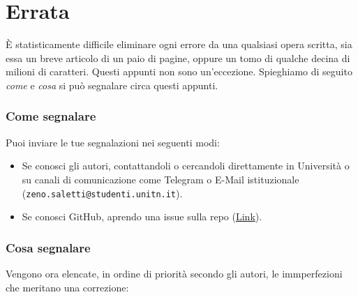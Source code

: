 \section*{Errata}
È statisticamente difficile eliminare ogni errore da una qualsiasi opera scritta, sia
essa un breve articolo di un paio di pagine, oppure un tomo di qualche decina di milioni
di caratteri. Questi appunti non sono un'eccezione.
Spieghiamo di seguito \textit{come} e \textit{cosa} si può segnalare circa questi appunti.

\subsubsection*{Come segnalare}
Puoi inviare le tue segnalazioni nei seguenti modi:
\begin{itemize}
    \item Se conosci gli autori, contattandoli o cercandoli direttamente in Università
    o su canali di comunicazione come Telegram o E-Mail istituzionale
    (\texttt{zeno.saletti@studenti.unitn.it}).

    \item Se conosci GitHub, aprendo una issue sulla repo (\href{https://github.com/zenosalty/courses-phy}{\faGithub \space Link}).

\end{itemize}

\subsubsection*{Cosa segnalare}
Vengono ora elencate, in ordine di priorità secondo gli autori, le immperfezioni che meritano una correzione:

